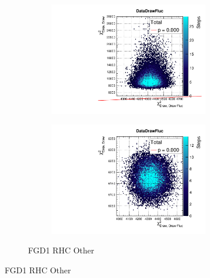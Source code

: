\begin{figure}[h]
\begin{subfigure}[t]{\textwidth}
\begin{subfigure}[t]{0.24\textwidth}
		\end{subfigure}
		\begin{subfigure}[t]{0.24\textwidth}
			\includegraphics[width=\textwidth, trim={0mm 0mm 0mm 8mm}, clip,page=137]{figures/mach3/2018/data/2018a_FixedCov_RedCov_Mpi_Data_merge_PriorPred_procs}
		\end{subfigure}
		\begin{subfigure}[t]{0.24\textwidth}
			\includegraphics[width=\textwidth, trim={0mm 0mm 0mm 8mm}, clip,page=137]{figures/mach3/2018/data/2018a_FixedCov_RedCov_Mpi_Data_merge_PostPredStore_FullLLH_procs}
		\end{subfigure}
		\caption{FGD1 \numu RHC Other}
	\end{subfigure}
	

\end{figure}
